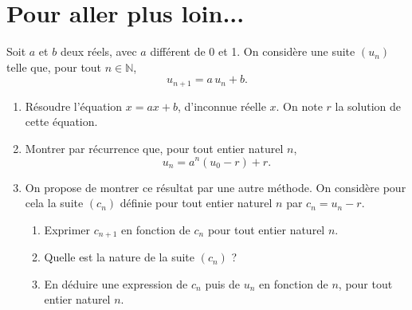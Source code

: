 \documentclass[11pt,fleqn]{book} %
\begin{document}
\section*{Pour aller plus loin...}

\begin{exercise}[subtitle={(Suites arithmético-géométriques)}]

 Soit \(a\) et \(b\) deux réels, avec \(a\) différent de 0 et 1. On considère une suite \((u_n)\) telle que, pour tout \(n\in\mathbb{N}\), 
\[u_{n+1}=a\,u_n+b.\]
\begin{enumerate}
\item Résoudre l'équation \(x =ax+b\), d'inconnue réelle \(x\). On note \(r\) la solution de cette équation.
\item Montrer par récurrence que, pour tout entier naturel \(n\),
\[u_n=a^n(u_0-r)+r.\]
\item On propose de montrer ce résultat par une autre méthode. On considère pour cela la suite \((c_n)\) définie pour tout entier naturel \(n\) par \(c_n=u_n-r\).
\begin{enumerate}
\item Exprimer \(c_{n+1}\) en fonction de \(c_n\) pour tout entier naturel \(n\). 
\item Quelle est la nature de la suite \((c_n)\) ?
\item En déduire une expression de \(c_n\) puis de \(u_n\) en fonction de \(n\), pour tout entier naturel \(n\).\end{enumerate}\end{enumerate}\end{exercise}
\end{document}
